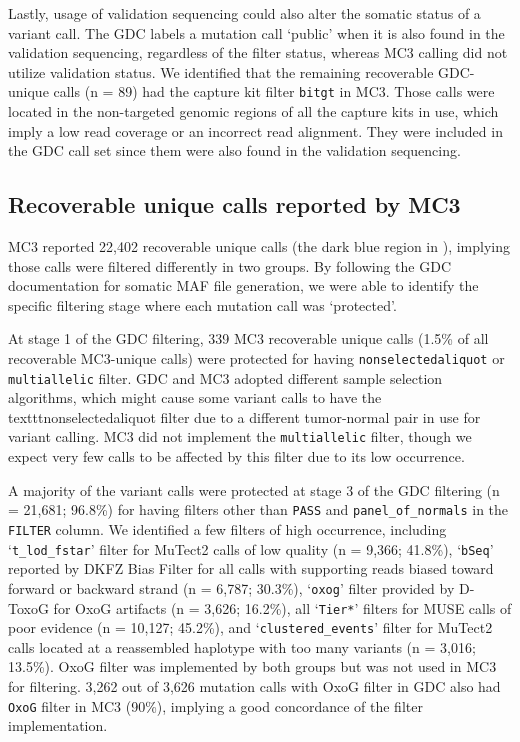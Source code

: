 Lastly, usage of validation sequencing could also alter the somatic status of a variant call. The GDC labels a mutation call `public' when it is also found in the validation sequencing, regardless of the filter status, whereas MC3 calling did not utilize validation status. We identified that the remaining recoverable GDC-unique calls (n = 89) had the capture kit filter \texttt{bitgt} in MC3. Those calls were located in the non-targeted genomic regions of all the capture kits in use, which imply a low read coverage or an incorrect read alignment. They were included in the GDC call set since them were also found in the validation sequencing.


\subsection{Recoverable unique calls reported by MC3}
MC3 reported 22,402 recoverable unique calls (the dark blue region in ), implying those calls were filtered differently in two groups. By following the GDC documentation for somatic MAF file generation, we were able to identify the specific filtering stage where each mutation call was `protected'.

At stage 1 of the GDC filtering, 339 MC3 recoverable unique calls (1.5\% of all recoverable MC3-unique calls) were protected for having \texttt{nonselectedaliquot} or \texttt{multiallelic} filter. GDC and MC3 adopted different sample selection algorithms, which might cause some variant calls to have the texttt{nonselectedaliquot} filter due to a different tumor-normal pair in use for variant calling. MC3 did not implement the \texttt{multiallelic} filter, though we expect very few calls to be affected by this filter due to its low occurrence.

A majority of the variant calls were protected at stage 3 of the GDC filtering (n = 21,681; 96.8\%) for having filters other than \texttt{PASS} and \texttt{panel\_of\_normals} in the \texttt{FILTER} column. We identified a few filters of high occurrence, including `\texttt{t\_lod\_fstar}' filter for MuTect2 calls of low quality (n = 9,366; 41.8\%), `\texttt{bSeq}' reported by DKFZ Bias Filter for all calls with supporting reads biased toward forward or backward strand (n = 6,787; 30.3\%), `\texttt{oxog}' filter provided by D-ToxoG \cite{costellom_getzg:DiscoveryCharacterization2013} for OxoG artifacts (n = 3,626; 16.2\%), all `\texttt{Tier*}' filters for MUSE calls of poor evidence (n = 10,127; 45.2\%), and `\texttt{clustered\_events}' filter for MuTect2 calls located at a reassembled haplotype with too many variants (n = 3,016; 13.5\%). OxoG filter was implemented by both groups but was not used in MC3 for filtering. 3,262 out of 3,626 mutation calls with OxoG filter in GDC also had \texttt{OxoG} filter in MC3 (90\%), implying a good concordance of the filter implementation.

